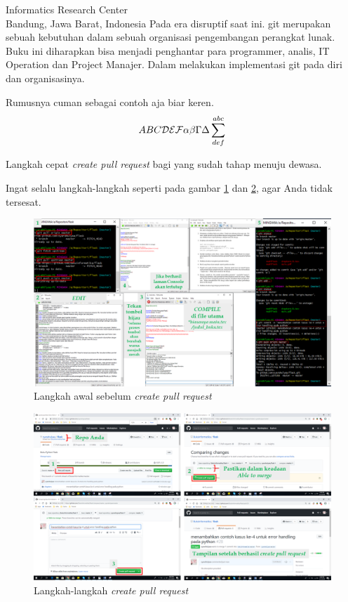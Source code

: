 

{Informatics Research Center\\
Bandung, Jawa Barat, Indonesia}
Pada era disruptif   
saat ini. git merupakan sebuah kebutuhan dalam sebuah organisasi pengembangan perangkat lunak.
Buku ini diharapkan bisa menjadi penghantar para programmer, analis, IT Operation dan Project Manajer.
Dalam melakukan implementasi git pada diri dan organisasinya.

Rumusnya cuman sebagai contoh aja biar keren\cite{awangga2018sampeu}.
\begin{equation}
ABC {\cal DEF} \alpha\beta\Gamma\Delta\sum^{abc}_{def}
\end{equation}

Langkah cepat \textit{create pull request} bagi yang sudah tahap menuju dewasa.


Ingat selalu langkah-langkah seperti pada gambar \ref{fig:langkahawal} dan \ref{fig:createpullrequest}, agar Anda tidak tersesat.
\begin{figure}[!htbp]
\centerline{\includegraphics[width=1\textwidth]{Figures/langkahawal.PNG}}
\caption{Langkah awal sebelum \textit{create pull request}}
\label{fig:langkahawal}
\end{figure}

\begin{figure}[!htbp]
\centerline{\includegraphics[width=1\textwidth]{Figures/createpullrequest.PNG}}
\caption{Langkah-langkah \textit{create pull request}}
\label{fig:createpullrequest}
\end{figure}